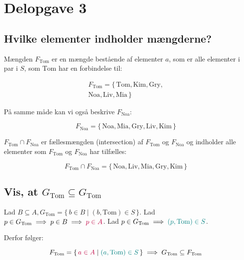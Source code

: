 \section{Delopgave 3}\label{sec:delopgave-3}

\subsection{Hvilke elementer indholder mængderne?}\label{subsec:hvilke-elementer-indholder-mngderne?}

Mængden \(F_{\text{Tom}}\) er en mængde bestående af elementer \(a\), som er alle elementer i par i \(S\), som
\(\text{Tom}\) har en forbindelse til:

\begin{equation}
    \begin{split}
        F_{\text{Tom}} = \{\,\text{Tom}, \text{Kim}, \text{Gry}, \\
        \text{Noa}, \text{Liv}, \text{Mia}\,\}
    \end{split}\label{eq:equation9}
\end{equation}

På samme måde kan vi også beskrive \(F_{\text{Noa}}\):

\begin{equation}
    F_{\text{Noa}} = \{\,\text{Noa}, \text{Mia}, \text{Gry}, \text{Liv}, \text{Kim}\,\}\label{eq:equation8}
\end{equation}

\(F_{\text{Tom}} \cap F_{\text{Noa}}\) er fællesmængden (intersection) af \(F_{\text{Tom}}\) og \(F_{\text{Noa}}\)
og indholder alle elementer som \(F_{\text{Tom}}\) og \(F_{\text{Noa}}\) har tilfælles:

\begin{equation}
    F_{\text{Tom}} \cap F_{\text{Noa}} = \{\,\text{Noa}, \text{Liv}, \text{Mia}, \text{Gry}, \text{Kim}\,\}
    \label{eq:equation10}
\end{equation}

\subsection{Vis, at \(G_{\text{Tom}} \subseteq G_{\text{Tom}}\)}
\label{subsec:vis-at-(g_{text{tom}}-subseteq-g_{text{tom}})}

Lad \(B \subseteq A, G_{\text{Tom}} = \{\,b \in B \mid (b, \text{Tom}) \in S\,\}\label{eq:equation11}\).
Lad \(p \in G_{\text{Tom}} \implies p \in B \implies \textcolor{purple}{p \in A}\).
Lad \(p \in G_{\text{Tom}} \implies \textcolor{teal}{(p, \text{Tom}) \in S}\).

Derfor følger:

\begin{equation}
    F_{\text{Tom}} = \{\,\textcolor{purple}{a \in A} \mid \textcolor{teal}{(a, \text{Tom}) \in S}\,\} \implies
    G_{\text{Tom}} \subseteq F_{\text{Tom}}\label{eq:equation2}
\end{equation}
